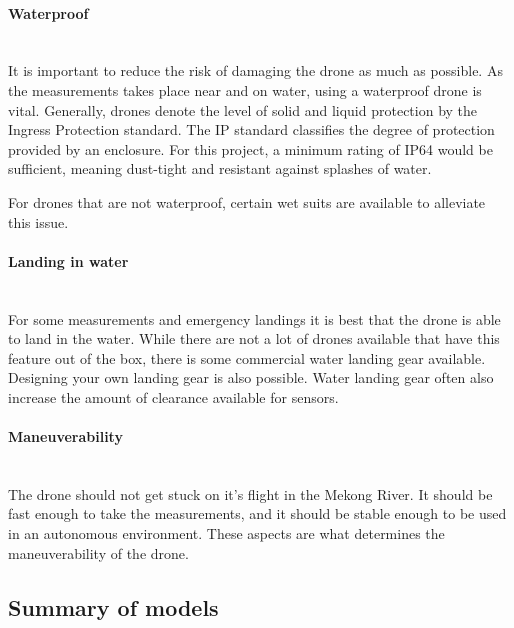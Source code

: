 \paragraph{Waterproof}\mbox{} \\
It is important to reduce the risk of damaging the drone as much as possible. As the measurements takes place near and on water, using a waterproof drone is vital. Generally, drones denote the level of solid and liquid protection by the Ingress Protection standard. The IP standard classifies the degree of protection provided by an enclosure. \cite{ipstandard} For this project, a minimum rating of IP64 would be sufficient, meaning dust-tight and resistant against splashes of water.

For drones that are not waterproof, certain wet suits are available to alleviate this issue. \cite{phantomrain}

\paragraph{Landing in water}\mbox{} \\
For some measurements and emergency landings it is best that the drone is able to land in the water. While there are not a lot of drones available that have this feature out of the box, there is some commercial water landing gear available.\cite{buylanding} Designing your own landing gear is also possible. \cite{diylanding} Water landing gear often also increase the amount of clearance available for sensors.

\paragraph{Maneuverability}\mbox{} \\
The drone should not get stuck on it's flight in the Mekong River. It should be fast enough to take the measurements, and it should be stable enough to be used in an autonomous environment. These aspects are what determines the maneuverability of the drone.








\subsection{Summary of models}

